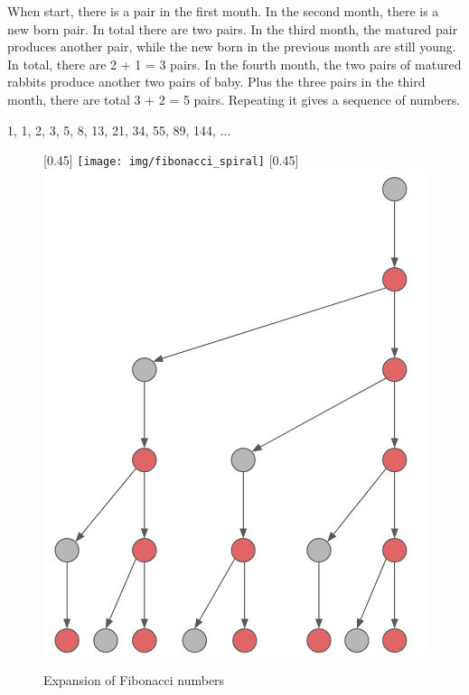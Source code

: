 \documentclass[b5paper]{article}
\begin{document}
When start, there is a pair in the first month. In the second month, there is a new born pair. In total there are two pairs. In the third month, the matured pair produces another pair, while the new born in the previous month are still young. In total, there are 2 + 1 = 3 pairs. In the fourth month, the two pairs of matured rabbits produce another two pairs of baby. Plus the three pairs in the third month, there are total 3 + 2 = 5 pairs. Repeating it gives a sequence of numbers.

1, 1, 2, 3, 5, 8, 13, 21, 34, 55, 89, 144, ...

\begin{figure}[htbp]
 \centering
 [0.45\linewidth]{
     \texttt{[image: img/fibonacci\_spiral]}}
 [0.45\linewidth]{
     \includegraphics[scale=0.3]{img/Fibonacci-rabbits}}
 \caption{Expansion of Fibonacci numbers}
 \label{fig:fibonacci_spiral}
 \label{fig:Fibonacci-rabbits}
\end{figure}
\end{document}
